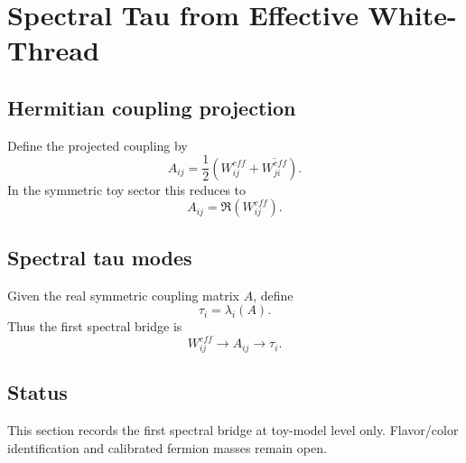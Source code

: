 \section{Spectral Tau from Effective White-Thread}
\label{sec:spectral-tau-from-white-thread}

\subsection{Hermitian coupling projection}
Define the projected coupling by
\begin{equation}
A_{ij} = \frac{1}{2}\left(W^{eff}_{ij}+\overline{W^{eff}_{ji}}\right).
\end{equation}
In the symmetric toy sector this reduces to
\begin{equation}
A_{ij}=\Re(W^{eff}_{ij}).
\end{equation}

\subsection{Spectral tau modes}
Given the real symmetric coupling matrix $A$, define
\begin{equation}
\tau_i = \lambda_i(A).
\end{equation}
Thus the first spectral bridge is
\begin{equation}
W^{eff}_{ij} \to A_{ij} \to \tau_i.
\end{equation}

\subsection{Status}
This section records the first spectral bridge at toy-model level only. Flavor/color identification and calibrated fermion masses remain open.
